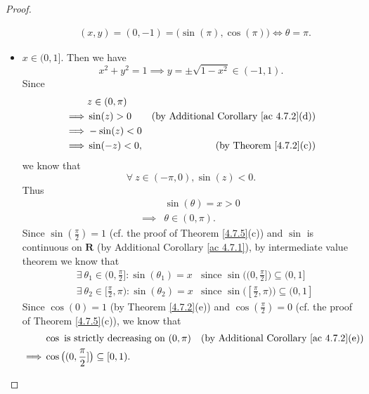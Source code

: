 \begin{proof}
\begin{itemize}
\begin{align*}
                   & (x, y) = (0, -1) = \big(\sin(\pi), \cos(\pi)\big) \iff \theta = \pi.
              \end{align*}
        \item \(x \in (0, 1]\).
              Then we have
              \[
                  x^2 + y^2 = 1 \implies y = \pm \sqrt{1 - x^2} \in (-1, 1).
              \]
              Since
              \begin{align*}
                           & z \in (0, \pi)                                                      \\
                  \implies & \sin(z) > 0    & \text{(by Additional Corollary \ref{ac 4.7.2}(d))} \\
                  \implies & -\sin(z) < 0                                                        \\
                  \implies & \sin(-z) < 0,  & \text{(by Theorem \ref{4.7.2}(c))}
              \end{align*}
              we know that
              \[
                  \forall\ z \in (-\pi, 0), \sin(z) < 0.
              \]
              Thus
              \begin{align*}
                           & \sin(\theta) = x > 0 \\
                  \implies & \theta \in (0, \pi).
              \end{align*}
              Since \(\sin(\frac{\pi}{2}) = 1\) (cf. the proof of Theorem \ref{4.7.5}(c)) and \(\sin\) is continuous on \(\mathbf{R}\) (by Additional Corollary \ref{ac 4.7.1}), by intermediate value theorem we know that
              \begin{align*}
                   & \exists\ \theta_1 \in (0, \frac{\pi}{2}] : \sin(\theta_1) = x   & \text{since } \sin\big((0, \frac{\pi}{2}]\big) \subseteq (0, 1]   \\
                   & \exists\ \theta_2 \in [\frac{\pi}{2}, \pi) : \sin(\theta_2) = x & \text{since } \sin\big([\frac{\pi}{2}, \pi)\big) \subseteq (0, 1]
              \end{align*}
              Since \(\cos(0) = 1\) (by Theorem \ref{4.7.2}(e)) and \(\cos(\frac{\pi}{2}) = 0\) (cf. the proof of Theorem \ref{4.7.5}(c)), we know that
              \begin{align*}
                           & \cos \text{ is strictly decreasing on } (0, \pi)   & \text{(by Additional Corollary \ref{ac 4.7.2}(e))} \\
                  \implies & \cos\big((0, \frac{\pi}{2}]\big) \subseteq [0, 1).

\end{align*}
\end{itemize}
\end{proof}
